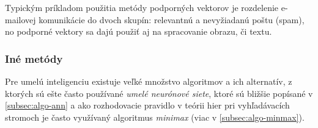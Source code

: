 Typickým príkladom použitia metódy podporných vektorov je rozdelenie e-mailovej komunikácie do dvoch skupín: relevantnú
a nevyžiadanú poštu (spam), no podporné vektory sa dajú použiť aj na spracovanie obrazu, či textu.

\subsubsection{Iné metódy}

Pre umelú inteligenciu existuje veľké množstvo algoritmov a ich alternatív, z ktorých sú ešte často používané
\emph{umelé neurónové siete}, ktoré sú bližšie popísané v \autoref{subsec:algo-ann} a ako rozhodovacie pravidlo v
teórii hier pri vyhľadávacích stromoch je často využívaný algoritmus \emph{minimax} (viac v
\autoref{subsec:algo-minmax}).
